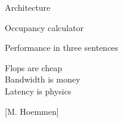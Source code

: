 \documentclass[english,compress]{beamer}
\begin{document}
\begin{frame}{Architecture}
  \begin{center}
    \Huge Occupancy calculator
  \end{center}
\end{frame}
\begin{frame}{Performance in three sentences}
  \begin{center}
    \Large
    Flops are cheap\\
    Bandwidth is money\\
    Latency is physics
  \end{center}
  \hfill [M. Hoemmen]
\end{frame}
\end{document}
